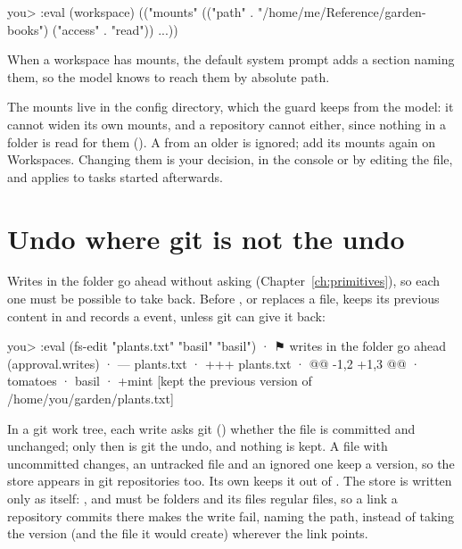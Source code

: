 \begin{txt}
you> :eval (workspace)
(("mounts" (("path" . "/home/me/Reference/garden-books") ("access" . "read")) ...))
\end{txt}

When a workspace has mounts, the default system prompt adds a section
naming them, so the model knows to reach them by absolute path.

\begin{careful}
The mounts live in the config directory, which the guard keeps from the
model: it cannot widen its own mounts, and a repository cannot either, since
nothing in a folder is read for them (). A
 from an older \nodwyn{} is ignored; add its
mounts again on Workspaces. Changing them is your decision, in the console
or by editing the file, and applies to tasks started afterwards.
\end{careful}

\section{Undo where git is not the undo}

Writes in the folder go ahead without asking (Chapter~\ref{ch:primitives}),
so each one must be possible to take back. Before ,
 or  replaces a file, \nodwyn{} keeps its
previous content in  and records a
 event, unless git can give it back:

\begin{txt}
you> :eval (fs-edit "plants.txt" "basil" "basil\nmint")
· ⚑ writes in the folder go ahead (approval.writes)
· --- plants.txt
· +++ plants.txt
· @@ -1,2 +1,3 @@
·  tomatoes
·  basil
· +mint
[kept the previous version of /home/you/garden/plants.txt]
\end{txt}

In a git work tree, each write asks git () whether the
file is committed and unchanged; only then is git the undo, and nothing is
kept. A file with uncommitted changes, an untracked file and an ignored one
keep a version, so the store appears in git repositories too. Its own
 keeps it out of . The store is written
only as itself: ,  and  must be
folders and its files regular files, so a link a repository commits there
makes the write fail, naming the path, instead of taking the version (and
the file it would create) wherever the link points.

